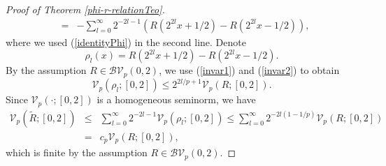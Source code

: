 \documentclass{amsart}
\numberwithin{equation}{section}
\begin{document}
\begin{proof}[Proof of Theorem \ref{phi-r-relationTeo}]
\begin{eqnarray}
        \nonumber
        &=&-\sum_{l=0}^\infty 2^{-2l-1}\left(R(2^{2l}x+1/2)-R(2^{2l}x-1/2)\right),
    \end{eqnarray}
    where we used (\ref{identityPhi}) in the second line. Denote
    \begin{equation}
        \nonumber
        \rho_l(x)=R(2^{2l}x+1/2)-R(2^{2l}x-1/2).
    \end{equation}
    By the assumption $R\in\mathcal{BV}_p(0,2)$, we use (\ref{invar1}) and (\ref{invar2}) to obtain
    \begin{equation}
        \nonumber
        \mathcal{V}_p(\rho_l;[0,2])\le 2^{2l/p+1}\mathcal{V}_p(R;[0,2]).
    \end{equation}
    Since $\mathcal{V}_p(\cdot;[0,2])$ is a homogeneous seminorm, we have 
    \begin{eqnarray}
        \nonumber
        \mathcal{V}_p(\widetilde{R};[0,2])&\le&\sum_{l=0}^\infty2^{-2l-1}\mathcal{V}_p(\rho_l;[0,2])\le\sum_{l=0}^\infty 2^{-2l(1-1/p)}\mathcal{V}_p(R;[0,2])\\
        \nonumber
        &=&c_p\mathcal{V}_p(R;[0,2]),
    \end{eqnarray}
    which is finite by the assumption $R\in\mathcal{BV}_p(0,2)$.
\end{proof}
\end{document}
